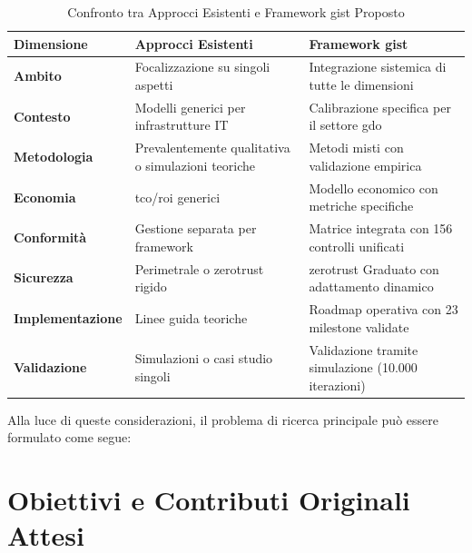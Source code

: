\begin{table}[htbp]
\centering
\small
\caption{Confronto tra Approcci Esistenti e Framework \gls{gist} Proposto}
\label{tab:confronto_approcci}
\begin{tabularx}{\textwidth}{@{}lXX@{}}
\toprule
\textbf{Dimensione} & \textbf{Approcci Esistenti} & \textbf{Framework \gls{gist}} \\
\midrule
\textbf{Ambito} & Focalizzazione su singoli aspetti & Integrazione sistemica di tutte le dimensioni \\
\textbf{Contesto} & Modelli generici per infrastrutture IT & Calibrazione specifica per il settore \gls{gdo} \\
\textbf{Metodologia} & Prevalentemente qualitativa o simulazioni teoriche & Metodi misti con validazione empirica \\
\textbf{Economia} & \gls{tco}/\gls{roi} generici & Modello economico con metriche specifiche \\
\textbf{Conformità} & Gestione separata per framework & Matrice integrata con 156 controlli unificati \\
\textbf{Sicurezza} & Perimetrale o \gls{zerotrust} rigido & \gls{zerotrust} Graduato con adattamento dinamico \\
\textbf{Implementazione} & Linee guida teoriche & Roadmap operativa con 23 milestone validate \\
\textbf{Validazione} & Simulazioni o casi studio singoli & Validazione tramite simulazione (10.000 iterazioni) \\
\bottomrule
\end{tabularx}
\end{table}

Alla luce di queste considerazioni, il problema di ricerca principale può essere formulato come segue:

\begin{center}
\end{center}

\section{\texorpdfstring{\textbf{Obiettivi e Contributi Originali Attesi}}{1.3 - Obiettivi e Contributi Originali Attesi}}
\label{sec:obiettivi}

